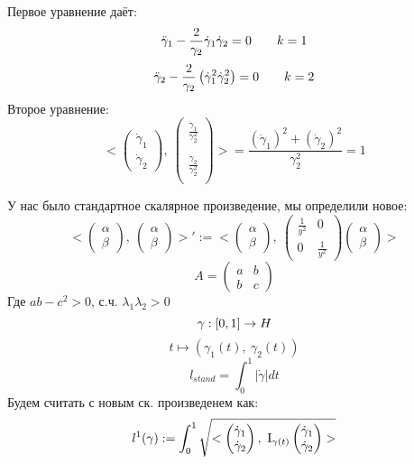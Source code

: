 \documentclass[main]{subfiles}
\begin{document}
    \begin{sol}
        Первое уравнение даёт:
        \[\ddot{\gamma}_1 - \frac{2}{\gamma_2} \dot{\gamma}_1 \dot{\gamma}_2 = 0 \qquad k=1\]
        \[\ddot{\gamma}_2 - \frac{2}{\gamma_2} \left(\dot{\gamma}_1^2 \dot{\gamma}_2^2\right) = 0 \qquad k=2\]
        Второе уравнение:
        \[<\begin{pmatrix}
            \dot{\gamma}_1\\
            \dot{\gamma}_2
        \end{pmatrix},\ \begin{pmatrix}
            \frac{\dot{\gamma}_1}{\gamma_2^2}\\ \\
            \frac{\dot{\gamma}_2}{\gamma_2^2}\\
        \end{pmatrix}> = \frac{(\dot{\gamma}_1)^2 + (\dot{\gamma}_2)^2}{\gamma_2^2} = 1\]
    \end{sol}

    \begin{definition}
      У нас было стандартное скалярное произведение, мы определили новое:
      \[<\begin{pmatrix}
        \alpha\\
        \beta
      \end{pmatrix},\ \begin{pmatrix}
        \alpha\\
        \beta
      \end{pmatrix}>' := <\begin{pmatrix}
        \alpha\\
        \beta
      \end{pmatrix},\ \begin{pmatrix}
        \frac{1}{y^2} & 0\\
        0 & \frac{1}{y^2}
      \end{pmatrix}\begin{pmatrix}
        \alpha\\
        \beta
      \end{pmatrix}>\]
      \[A = \begin{pmatrix}
        a & b\\
        b & c
      \end{pmatrix}\]
      Где $ab - c^2 > 0$, с.ч. $\lambda_1 \lambda_2 > 0$
      \[\gamma: [0,1] \rightarrow H\]
      \[t \mapsto (\gamma_1(t),\ \gamma_2(t))\]
      \[l_{stand} = \int_0^1  |\dot{\gamma}| dt\]
      Будем считать с новым ск. произведенем как:
      \[l^1 (\gamma) := \int_0^1 \sqrt{<\begin{pmatrix}
        \dot{\gamma}_1\\
        \dot{\gamma}_2
      \end{pmatrix},\ \RNumb{1}_{\gamma(t)} \begin{pmatrix}
        \dot{\gamma}_1\\
        \dot{\gamma}_2
      \end{pmatrix}>}\]
    \end{definition}
\end{document}
